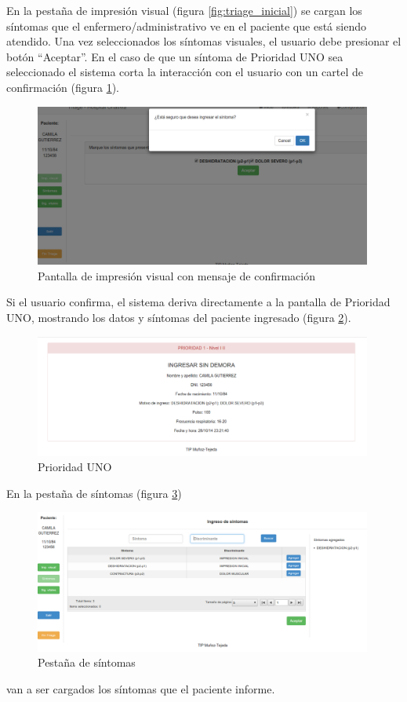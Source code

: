 En la pestaña de impresión visual (figura \ref{fig:triage_inicial}) se cargan los síntomas que el enfermero/administrativo ve en el paciente que está siendo atendido. Una vez seleccionados los síntomas visuales, el usuario debe presionar el botón ``Aceptar''. En el caso de que un síntoma de Prioridad UNO sea seleccionado el sistema corta la interacción con el usuario con un cartel de confirmación (figura \ref{fig:impresion_visual_p1}).
\begin{figure}
\centerline{\includegraphics[width=0.99\textwidth]{impresion_visual_p1.png}}
\caption{Pantalla de impresión visual con mensaje de confirmación} \label{fig:impresion_visual_p1}
\end{figure}
Si el usuario confirma, el sistema deriva directamente a la pantalla de Prioridad UNO, mostrando los datos y síntomas del paciente ingresado (figura \ref{fig:prioridad_uno}).
\begin{figure}
\centerline{\includegraphics[width=0.99\textwidth]{prioridad_uno.png}}
\caption{Prioridad UNO} \label{fig:prioridad_uno}
\end{figure}

En la pestaña de síntomas (figura \ref{fig:sintomas})
\begin{figure}
\centerline{\includegraphics[width=0.99\textwidth]{sintomas.png}}
\caption{Pestaña de síntomas} \label{fig:sintomas}
\end{figure}
van a ser cargados los síntomas que el paciente informe. 

